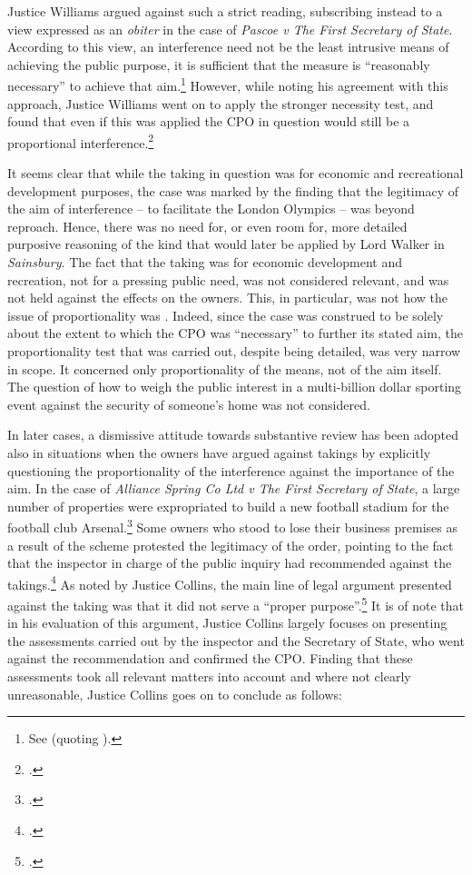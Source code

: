 Justice Williams argued against such a strict reading, subscribing instead to a view expressed as an {\it obiter} in the case of {\it Pascoe v The First Secretary of State}. According to this view, an interference need not be the least intrusive means of achieving the public purpose, it is sufficient that the measure is ``reasonably necessary'' to achieve that aim.\footnote{See \cite[74-75]{pascoe06} (quoting \cite[25]{clay04}).} However, while noting his agreement with this approach, Justice Williams went on to apply the stronger necessity test, and found that even if this was applied the CPO in question would still be a proportional interference.\footcite[41-50]{smith08}

It seems clear that while the taking in question was for economic and recreational development purposes, the case was marked by the finding that the legitimacy of the aim of interference -- to facilitate the London Olympics -- was beyond reproach. Hence, there was no need for, or even room for, more detailed purposive reasoning of the kind that would later be applied by Lord Walker in {\it Sainsbury}. The fact that the taking was for economic development and recreation, not for a pressing public need, was not considered relevant, and was not held against the effects on the owners. This, in particular, was not how the issue of proportionality was . Indeed, since the case was construed to be solely about the extent to which the CPO was ``necessary'' to further its stated aim, the proportionality test that was carried out, despite being detailed, was very narrow in scope. It concerned only proportionality of the means, not of the aim itself. The question of how to weigh the public interest in a multi-billion dollar sporting event against the security of someone's home was not considered.

In later cases, a dismissive attitude towards substantive review has been adopted also in situations when the owners have argued against takings by explicitly questioning the proportionality of the interference against the importance of the aim. In the case of {\it Alliance Spring Co Ltd v The First Secretary of State}, a large number of properties were expropriated to build a new football stadium for the football club Arsenal.\footcite{alliance06} Some owners who stood to lose their business premises as a result of the scheme protested the legitimacy of the order, pointing to the fact that the inspector in charge of the public inquiry had recommended against the takings.\footcite[6-7]{alliance06} As noted by Justice Collins, the main line of legal argument presented against the taking was that it did not serve a ``proper purpose''.\footcite[19]{alliance06} It is of note that in his evaluation of this argument, Justice Collins largely focuses on presenting the assessments carried out by the inspector and the Secretary of State, who went against the recommendation and confirmed the CPO. Finding that these assessments took all relevant matters into account and where not clearly unreasonable, Justice Collins goes on to conclude as follows: 

